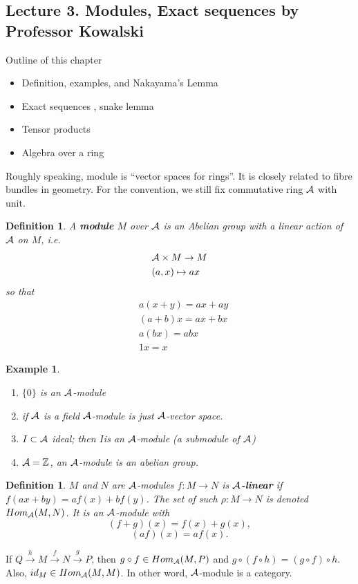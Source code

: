 \documentclass[11pt]{article}
\newtheorem{dfn}[thm]{Definition}
\newtheorem{ex}[thm]{Example}
\newcommand{\intg}{\mathbb Z}
\newcommand{\cala}{{\cal A}}
\newcommand{\lrta}{\longrightarrow}
\begin{document}
\subsection{Lecture 3. Modules, Exact sequences by Professor Kowalski}
Outline of this chapter 
\begin{itemize}
\item Definition, examples, and Nakayama's Lemma
\item Exact sequences , snake lemma
\item Tensor products
\item Algebra over a ring
\end{itemize}
Roughly speaking, module is ``vector spaces for rings''. It is closely related to fibre bundles in geometry. For the convention, we still fix commutative ring $\cala$ with unit.
\begin{dfn}
A \textbf{module} $M$ over $\cala$ is an Abelian group with a linear action of $\cala$ on $M$, i.e.
$$
\begin{aligned}
& \cala\times M\rightarrow M\\
& (a,x)\mapsto ax
\end{aligned}
$$
so that 
$$
\begin{aligned}
&a(x+y)=ax+ay\\
&(a+b)x=ax+bx\\
&a(bx)=ab x\\
& 1 x= x
\end{aligned}
$$
\end{dfn}

\begin{ex}\ 
\begin{enumerate}
\item $\{0\}$ is an $\cala$-module
\item if $\cala$ is a field $\cala$-module is just $\cala$-vector space.
\item $I\subset\cala$ ideal; then $I$is an $\cala$-module (a submodule of $\cala$)
\item $\cala=\intg$, an $\cala$-module is an abelian group.
\end{enumerate}
\end{ex}

\begin{dfn}
$M$ and $N$ are $\cala$-modules $f:M\rightarrow N$ is  \textbf{$\cala$-linear} if $f(ax+by)=af(x)+bf(y)$. The set of such $\rho:M\rightarrow N$ is denoted $Hom_{\cala}(M,N)$. It is an $\cala$-module with
$$
(f+g)(x)=f(x)+g(x),
$$
$$
(af)(x)=af(x).
$$
\end{dfn}
If
$Q\overset{h}{\lrta }M\overset{f}{\lrta} N\overset{g}{\lrta} P$, then $g\circ f\in Hom_\cala(M,P)$ and $g\circ(f\circ h)=(g\circ f)\circ h$. Also, $id_M\in Hom_\cala(M,M)$. In other word, $\cala$-module is a category.
\end{document}

